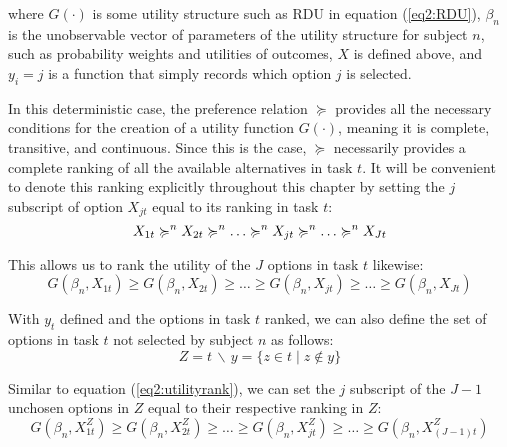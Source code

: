 \documentclass[../main.tex]{subfiles}
\begin{document}
\noindent where $G(\cdot)$ is some utility structure such as RDU in equation (\ref{eq2:RDU}), $\beta_n$ is the unobservable vector of parameters of the utility structure for subject $n$, such as probability weights and utilities of outcomes, $X$ is defined above, and $y_i=j$ is a function that simply records which option $j$ is selected.

In this deterministic case, the preference relation $\succcurlyeq$ provides all the necessary conditions for the creation of a utility function $G(\cdot)$, meaning it is complete, transitive, and continuous.
Since this is the case, $\succcurlyeq$ necessarily provides a complete ranking of all the available alternatives in task $t$.
It will be convenient to denote this ranking explicitly throughout this chapter by setting the $j$ subscript of option $X_{jt}$ equal to its ranking in task $t$:
\begin{equation}
	\label{eq2:outcomerank} 
	X_{1t} \succcurlyeq^n X_{2t} \succcurlyeq^n \ldots \succcurlyeq^n X_{jt} \succcurlyeq^n \ldots \succcurlyeq^n X_{Jt}\\
\end{equation}

\noindent This allows us to rank the utility of the $J$ options in task $t$ likewise:
\begin{equation}
	\label{eq2:utilityrank}
	G(\beta_n,X_{1t}) \geq G(\beta_n,X_{2t}) \geq \ldots \geq G(\beta_n,X_{jt}) \geq \ldots \geq G(\beta_n,X_{Jt})
\end{equation}

With $y_t$ defined and the options in task $t$ ranked, we can also define the set of options in task $t$ not selected by subject $n$ as follows:
\begin{equation}
	\label{eq2:emptyset}
	Z = t \,\backslash\, y = \{z \in t \;|\; z \notin y \}
\end{equation}

Similar to equation (\ref{eq2:utilityrank}), we can set the $j$ subscript of the $J-1$ unchosen options in $Z$ equal to their respective ranking in $Z$:
\begin{equation}
	\label{eq2:Zutilityrank}
	G(\beta_n,X_{1t}^Z) \geq G(\beta_n,X_{2t}^Z) \geq \ldots \geq G(\beta_n,X_{jt}^Z) \geq \ldots \geq G(\beta_n,X_{(J-1)t}^Z)
\end{equation}
 
\end{document}
